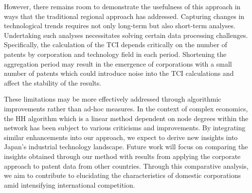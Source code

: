 \documentclass[fleqn,10pt]{wlscirep}
\begin{document}
However, there remains room to demonstrate the usefulness of this approach in ways that the traditional regional approach has addressed. Capturing changes in technological trends requires not only long-term but also short-term analyses. 
Undertaking such analyses necessitates solving certain data processing challenges. 
Specifically, the calculation of the TCI depends critically on the number of patents by corporation and technology field in each period. 
Shortening the aggregation period may result in the emergence of corporations with a small number of patents which could introduce noise into the TCI calculations and affect the stability of the results.

These limitations may be more effectively addressed through algorithmic improvements rather than ad-hoc measures. 
In the context of complex economics, the HH algorithm which is a linear method dependent on node degrees within the network has been subject to various criticisms and improvements. 
By integrating similar enhancements into our approach, we expect to derive new insights into Japan's industrial technology landscape. 
Future work will focus on comparing the insights obtained through our method with results from applying the corporate approach to patent data from other countries. 
Through this comparative analysis, we aim to contribute to elucidating the characteristics of domestic corporations amid intensifying international competition.
\end{document}
